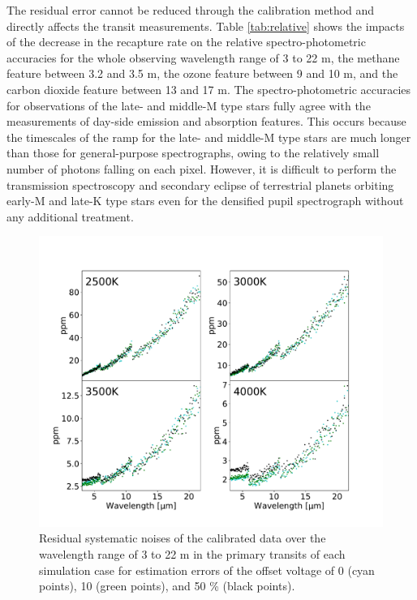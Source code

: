 \documentclass{aastex62}
\begin{document}
The residual error cannot be reduced through the calibration method and directly affects the transit measurements. Table \ref{tab:relative} shows the impacts of the decrease in the recapture rate on the relative spectro-photometric accuracies for the whole observing wavelength range of 3 to 22 \textmu m, the methane feature between 3.2 and 3.5 \textmu m, the ozone feature between 9 and 10 \textmu m, and the carbon dioxide feature between 13 and 17 \textmu m. The spectro-photometric accuracies for observations of the late- and middle-M type stars fully agree with the measurements of day-side emission and absorption features. This occurs because the timescales of the ramp for the late- and middle-M type stars are much longer than those for general-purpose spectrographs, owing to the relatively small number of photons falling on each pixel. However, it is difficult to perform the transmission spectroscopy and secondary eclipse of terrestrial planets orbiting early-M and late-K type stars even for the densified pupil spectrograph without any additional treatment.

\begin{figure}[H]
\begin{center}
\includegraphics[width=12cm]{offset_error.pdf}
\caption{Residual systematic noises of the calibrated data over the wavelength range of 3 to 22 \textmu m in the primary transits of each simulation case for estimation errors of the offset voltage of 0 (cyan points), 10 (green points), and 50 \% (black points). \label{fig:offset_error}}
\end{center}
\end{figure}
\end{document}
